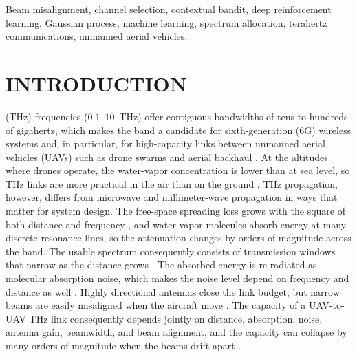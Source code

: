 \documentclass{ieee-ojvt}
\begin{document}
\begin{IEEEkeywords}
Beam misalignment, channel selection, contextual bandit, deep reinforcement learning,
Gaussian process, machine learning, spectrum allocation, terahertz communications,
unmanned aerial vehicles.
\end{IEEEkeywords}

\maketitle

\section{INTRODUCTION}
\label{sec:intro}
 (THz) frequencies ($0.1$--$10$~THz) offer contiguous
bandwidths of tens to hundreds of gigahertz, which makes the band a candidate for
sixth-generation (6G) wireless systems and, in particular, for high-capacity links
between unmanned aerial vehicles (UAVs) such as drone swarms and aerial backhaul
\cite{akyildiz2022thz,chaccour2022seven,azari2022thzuav}. At the altitudes where drones
operate, the water-vapor concentration is lower than at sea level, so THz links are more
practical in the air than on the ground \cite{saeed2020altitudes,saeed2021cfb}. THz
propagation, however, differs from microwave and millimeter-wave propagation in ways that
matter for system design. The free-space spreading loss grows with the square of both
distance and frequency \cite{jornet2011channel}, and water-vapor molecules absorb energy
at many discrete resonance lines, so the attenuation changes by orders of magnitude
across the band. The usable spectrum consequently consists of transmission windows that
narrow as the distance grows \cite{jornet2011channel,han2016multiwideband}. The absorbed
energy is re-radiated as molecular absorption noise, which makes the noise level depend on
frequency and distance as well \cite{jornet2011channel}. Highly
directional antennas close the link budget, but narrow beams are easily misaligned when
the aircraft move \cite{moorthy2022beam}. The capacity of a UAV-to-UAV THz link
consequently depends jointly on distance, absorption, noise, antenna gain, beamwidth,
and beam alignment, and the capacity can collapse by many orders of magnitude when the
beams drift apart \cite{10399804}.
\end{document}
